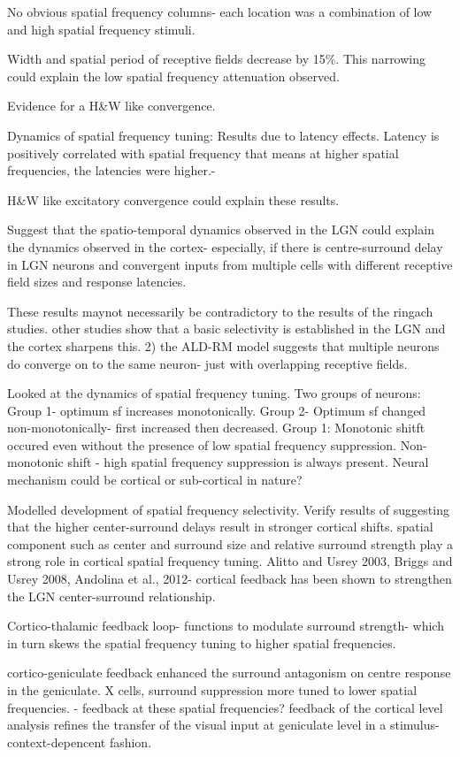 \documentclass {report}
\begin{document}
\cite{Sirovich2004} No obvious spatial frequency columns- each location was a combination of low and high spatial frequency stimuli. 



\cite{Malone2007} Width and spatial period of receptive fields decrease by 15\%. This narrowing could explain the low spatial frequency attenuation observed.

Evidence for a H\&W like convergence.

\cite{Frazor2008} Dynamics of spatial frequency tuning: Results due to latency effects. Latency is positively correlated with spatial frequency that means at higher spatial frequencies, the latencies were higher.-

H\&W like excitatory convergence  could explain these results.

\cite{Allen2006} Suggest that the spatio-temporal dynamics observed in the LGN could explain the dynamics observed in the cortex- especially, if there is centre-surround delay in LGN neurons and convergent inputs from multiple cells with different receptive field sizes and response latencies.

These results maynot necessarily be contradictory to the results of the ringach studies. other studies show that a basic selectivity is established in the LGN and the cortex sharpens this. 2) the ALD-RM model suggests that multiple neurons do converge on to the same neuron- just with overlapping receptive fields. 

\cite{Purushothaman2014} Looked at the dynamics of spatial frequency tuning. Two groups of neurons: Group 1- optimum sf increases monotonically. Group 2- Optimum sf changed non-monotonically- first increased then decreased. Group 1: Monotonic shitft occured even without the presence of low spatial frequency suppression. Non-monotonic shift - high spatial frequency suppression is always present. Neural mechanism could be cortical or sub-cortical in nature?

\cite{Nirody2014} Modelled development of spatial frequency selectivity. Verify results of \cite{Allen2006} suggesting that the higher center-surround delays result in stronger cortical shifts.
spatial component such as center and surround size and relative surround strength play a strong role in cortical spatial frequency tuning.
Alitto and Usrey 2003, Briggs and Usrey 2008, Andolina et al., 2012- cortical feedback has been shown to strengthen the LGN center-surround relationship.

Cortico-thalamic feedback loop- functions to modulate surround strength- which in turn skews the spatial frequency tuning to higher spatial frequencies. 

\cite{Cudeiro1996} cortico-geniculate feedback enhanced the surround antagonism on centre response in the geniculate. X cells, surround suppression more tuned to lower spatial frequencies. - feedback at these spatial frequencies? feedback of the cortical level analysis refines the transfer of the visual input at geniculate level in a stimulus-context-depencent fashion.





\end{document}
